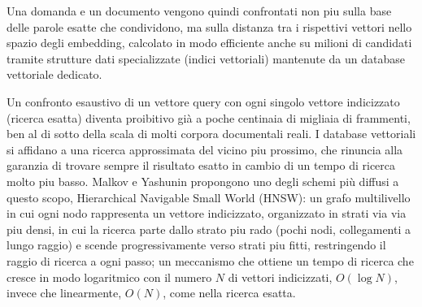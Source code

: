 Una domanda e un documento vengono quindi confrontati non piu sulla
base delle parole esatte che condividono, ma sulla distanza tra i rispettivi vettori nello spazio
degli embedding, calcolato in modo efficiente anche su milioni di candidati tramite strutture
dati specializzate (indici vettoriali) mantenute da un database vettoriale dedicato.

Un confronto esaustivo di un vettore query con ogni singolo vettore indicizzato (ricerca
esatta) diventa proibitivo già a poche centinaia di migliaia di frammenti, ben al di sotto della  scala di molti corpora documentali reali. I database vettoriali si affidano a una ricerca approssimata del vicino piu prossimo, che rinuncia alla garanzia di trovare sempre il risultato esatto in cambio di un tempo di
ricerca molto piu basso. Malkov e Yashunin \cite{malkov2018hnsw} propongono uno degli schemi più diffusi a
questo scopo, Hierarchical Navigable Small World (HNSW): un grafo multilivello in cui ogni
nodo rappresenta un vettore indicizzato, organizzato in strati via via piu densi, in cui la ricerca parte dallo strato piu rado (pochi nodi, collegamenti a lungo raggio) e scende progressivamente verso strati piu fitti, restringendo il raggio di ricerca a ogni passo; un meccanismo che ottiene un tempo di ricerca che cresce in modo logaritmico con il numero $N$ di vettori
indicizzati, $O(\log N)$, invece che linearmente, $O(N)$, come nella ricerca esatta.
